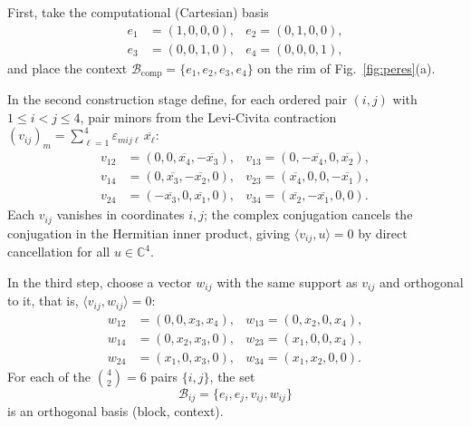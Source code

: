 \documentclass[%
  reprint,
  superscriptaddress,
  showkeys,
  amsmath,amssymb,
  aps,pra,
  longbibliography,
  floatfix,
  x11names
]{revtex4-2}
\begin{document}
First, take the computational (Cartesian) basis
\begin{align*}
e_1&=(1,0,0,0), &
e_2 =(0,1,0,0),\\
e_3&=(0,0,1,0), &
e_4 =(0,0,0,1),
\end{align*}
and place the context $\mathcal{B}_{\mathrm{comp}}=\{e_1,e_2,e_3,e_4\}$ on the rim of Fig.~\ref{fig:peres}(a).

In the second construction stage define, for each ordered pair $(i,j)$ with $1\le i<j\le 4$, pair minors from the Levi-Civita contraction $(v_{ij})_m=\sum_{\ell=1}^4\varepsilon_{mij\ell}\,\overline{x_\ell}$:
\begin{align*}
v_{12} &= (0,0,\overline{x_4},-\overline{x_3}), &
v_{13}  = (0,-\overline{x_4},0,\overline{x_2}), \\
v_{14} &= (0,\overline{x_3},-\overline{x_2},0), &
v_{23}  = (\overline{x_4},0,0,-\overline{x_1}), \\
v_{24} &= (-\overline{x_3},0,\overline{x_1},0), &
v_{34}  = (\overline{x_2},-\overline{x_1},0,0).
\end{align*}
Each $v_{ij}$ vanishes in coordinates $i,j$; the complex conjugation cancels the conjugation in the Hermitian inner product, giving $\langle v_{ij},u\rangle=0$ by direct cancellation for all $u\in\mathbb{C}^4$.

In the third step, choose a vector $w_{ij}$ with the same support as $v_{ij}$ and orthogonal to it, that is, $\langle v_{ij},w_{ij}\rangle=0$:
\begin{align*}
w_{12}&=(0,0,x_3,x_4), &
w_{13} =(0,x_2,0,x_4), \\
w_{14}&=(0,x_2,x_3,0), &
w_{23} =(x_1,0,0,x_4), \\
w_{24}&=(x_1,0,x_3,0), &
w_{34} =(x_1,x_2,0,0).
\end{align*}
For each of the $\binom{4}{2}=6$ pairs $\{i,j\}$, the set
\[
\mathcal{B}_{ij}=\{e_i, e_j, v_{ij}, w_{ij}\}
\]
is an orthogonal basis (block, context).
\end{document}
